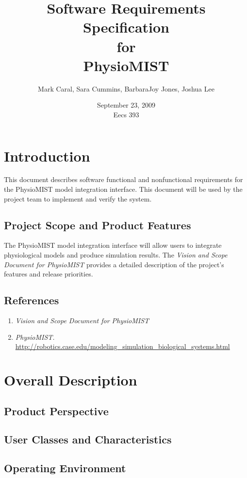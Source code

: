 \documentclass{article}
\title{Software Requirements Specification\\
\bigskip
{\large for}\\
\bigskip
PhysioMIST}
\author{Mark Caral, Sara Cummins, BarbaraJoy Jones, Joshua Lee}
\date{September 23, 2009\\{\sc Eecs} 393}
\begin{document}
\begin{titlepage}
\maketitle\thispagestyle{empty}
\end{titlepage}

\tableofcontents
\newpage

\section{Introduction}
This document describes software functional and nonfunctional requirements for the PhysioMIST model integration interface. This document will be used by the project team to implement and verify the system.

\subsection{Project Scope and Product Features}
The PhysioMIST model integration interface will allow users to integrate physiological models and produce simulation results. The \emph{Vision and Scope Document for PhysioMIST} provides a detailed description of the project's features and release priorities.

\subsection{References}
\begin{enumerate}
\item \emph{Vision and Scope Document for PhysioMIST}
\item \emph{PhysioMIST.} \url{http://robotics.case.edu/modeling_simulation_biological_systems.html}
\end{enumerate}

\section{Overall Description}
\subsection{Product Perspective}
\subsection{User Classes and Characteristics}
\subsection{Operating Environment}
\end{document}

